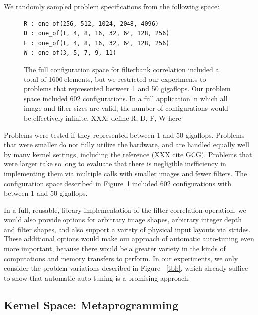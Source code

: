 \documentclass{sig-alternate}
\begin{document}
We randomly sampled problem specifications from the following space:
\begin{figure}
\begin{center}
\begin{minipage}{.4\textwidth}
\begin{verbatim}
R : one_of(256, 512, 1024, 2048, 4096)
D : one_of(1, 4, 8, 16, 32, 64, 128, 256)
F : one_of(1, 4, 8, 16, 32, 64, 128, 256)
W : one_of(3, 5, 7, 9, 11)
\end{verbatim}
\end{minipage}
\end{center}
\caption{The full configuration space for filterbank correlation included a
total of 1600 elements, but we restricted our experiments to problems that
represented between 1 and 50 gigaflops. Our problem space included 602
configurations. In a full application in which all image and filter sizes are
valid, the number of configurations would be effectively infinite.
XXX: define R, D, F, W here
}
\label{fig:probspace}
\end{figure}
Problems were tested if they represented between 1 and 50 gigaflops.  Problems
that were smaller do not fully utilize the hardware, and are handled equally
well by many kernel settings, including the reference (XXX cite GCG).
Problems that were larger take so long to evaluate that there is negligible
inefficiency in implementing them via multiple calls with smaller images and fewer filters.
The configuration space described in Figure~\ref{fig:probspace} included 602
configurations with between 1 and 50 gigaflops.

In a full, reusable, library implementation of the filter correlation
operation, we would also provide options for arbitrary image shapes,
arbitrary integer depth and filter shapes, and also support a variety of
physical input layouts via strides.  These additional options would make our
approach of automatic auto-tuning even more important, because there would be
a greater variety in the kinds of computations and memory transfers to
perform.  In our experiments, we only consider the problem variations
described in Figure ~\ref{tbl:}, which already suffice to show that automatic
auto-tuning is a promising approach.


\subsection{Kernel Space: Metaprogramming}
\end{document}
